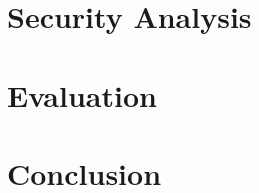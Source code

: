 \documentclass[10pt,conference]{IEEEtran}
\begin{document}
\section{Security Analysis}
\label{sec:security_analysis}
 
%

\section{Evaluation}
\label{sec:evaluation}

%

% 

\section{Conclusion}
\label{sec:conclusion}


% 

\ifCLASSOPTIONcaptionsoff
\newpage
\fi

\printbibliography[title=References]
\end{document}
